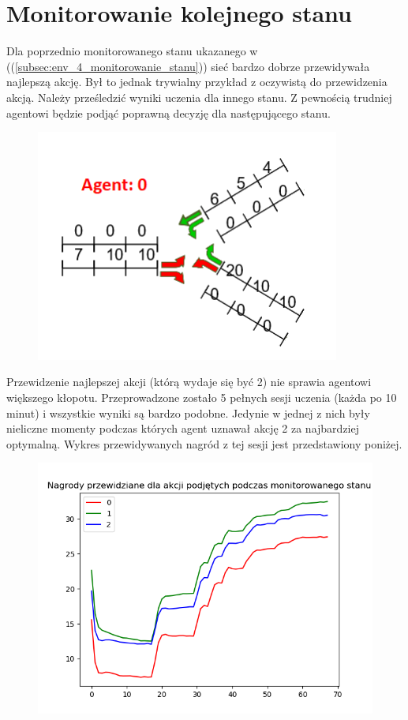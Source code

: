 \documentclass[12pt]{book}
\theoremstyle{plain}
\let\oldref\ref
\renewcommand{\ref}[1]{(\oldref{#1})}
\begin{document}
\section{Monitorowanie kolejnego stanu}	
	Dla poprzednio monitorowanego stanu ukazanego w (\ref{subsec:env_4_monitorowanie_stanu}) sieć bardzo dobrze przewidywała najlepszą akcję. Był to jednak trywialny przykład z oczywistą do przewidzenia akcją. Należy prześledzić wyniki uczenia dla innego stanu. Z pewnością trudniej agentowi będzie podjąć poprawną decyzję dla następującego stanu. 
	\begin{figure}[H]
		\centering
		\includegraphics[width=10cm]{env_4_monitorowany_stan_2.png}
		\label{fig:env_4_monitorowany_stan_2.png}
	\end{figure}
	
	Przewidzenie najlepszej akcji (którą wydaje się być 2) nie sprawia agentowi większego kłopotu. Przeprowadzone zostało 5 pełnych sesji uczenia (każda po 10 minut) i wszystkie wyniki są bardzo podobne. Jedynie w jednej z nich były nieliczne momenty podczas których agent uznawał akcję 2 za najbardziej optymalną. Wykres przewidywanych nagród z tej sesji jest przedstawiony poniżej.  
	\begin{figure}[H]
		\includegraphics[width=20cm]{env_4_monitorowany_stan_2_ucz.png}
		\label{fig:env_4_monitorowany_stan_2_ucz.png}
	\end{figure}
\end{document}
